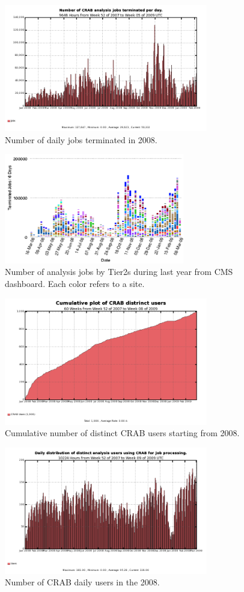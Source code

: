 \begin{figure}
\includegraphics[width=3.5in]{figures/crabjobsdaily.png}
\caption{Number of daily jobs terminated in 2008. }
\label{fig:jobs}
\end{figure}
\begin{figure}
\includegraphics[width=0.7\textwidth]{figures/AnalysisJobHistoryMarch0809.png}
\caption{Number of analysis jobs by Tier2s during last year from CMS dashboard. Each color refers to a site. }
\label{fig:AnalysisJobHistoryMarch0809}
\end{figure}

\begin{figure}
\includegraphics[width=3.5in]{figures/UserInteg.png}
\caption{Cumulative number of distinct CRAB users starting from 2008. }
\label{fig:intuser}
\end{figure}
\begin{figure}
\includegraphics[width=3.5in]{figures/crabusersdaily.png}
\caption{Number of CRAB daily users in the 2008. }
\label{fig:distusers}
\end{figure}

